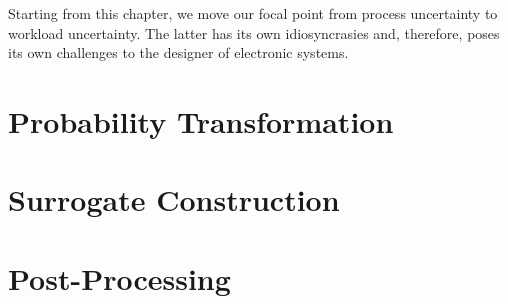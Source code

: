 Starting from this chapter, we move our focal point from process uncertainty to
workload uncertainty. The latter has its own idiosyncrasies and, therefore,
poses its own challenges to the designer of electronic systems.

\section{\introductiontitle}

\section{\motivationtitle}

\section{\problemtitle}

\section{\priortitle}

\section{\solutiontitle}

\section{Probability Transformation}

\section{Surrogate Construction}

\section{Post-Processing}

\section{\applicationtitle}

\section{\resultstitle}

\section{\conclusiontitle}
